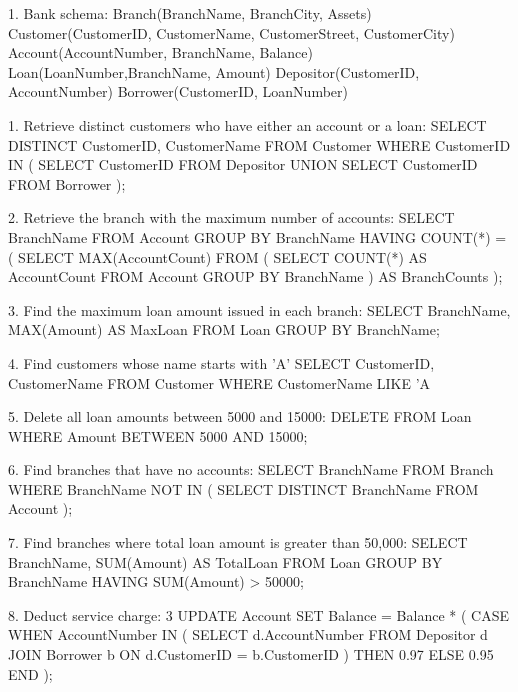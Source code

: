                1. Bank schema:
Branch(BranchName, BranchCity, Assets) Customer(CustomerID,
CustomerName, CustomerStreet, CustomerCity)
Account(AccountNumber, BranchName, Balance) 
Loan(LoanNumber,BranchName, Amount)
Depositor(CustomerID, AccountNumber)
Borrower(CustomerID, LoanNumber)


1. Retrieve distinct customers who have either an account or a loan:
SELECT DISTINCT CustomerID, CustomerName
FROM Customer
WHERE CustomerID IN (
SELECT CustomerID FROM Depositor
UNION
SELECT CustomerID FROM Borrower
);

2. Retrieve the branch with the maximum number of accounts:
SELECT BranchName
FROM Account
GROUP BY BranchName
HAVING COUNT(*) = (
SELECT MAX(AccountCount)
FROM (
SELECT COUNT(*) AS AccountCount
FROM Account
GROUP BY BranchName
) AS BranchCounts
);

3. Find the maximum loan amount issued in each branch:
SELECT BranchName, MAX(Amount) AS MaxLoan
FROM Loan
GROUP BY BranchName;

4. Find customers whose name starts with 'A'
SELECT CustomerID, CustomerName
FROM Customer
WHERE CustomerName LIKE 'A%

5. Delete all loan amounts between 5000 and 15000:
DELETE FROM Loan
WHERE Amount BETWEEN 5000 AND 15000;

6. Find branches that have no accounts:
SELECT BranchName
FROM Branch
WHERE BranchName NOT IN (
SELECT DISTINCT BranchName FROM Account
);

7. Find branches where total loan amount is greater than 50,000:
SELECT BranchName, SUM(Amount) AS TotalLoan
FROM Loan
GROUP BY BranchName
HAVING SUM(Amount) > 50000;

8. Deduct service charge: 3%
UPDATE Account
SET Balance = Balance * (
CASE
WHEN AccountNumber IN (
SELECT d.AccountNumber
FROM Depositor d
JOIN Borrower b ON d.CustomerID = b.CustomerID
) THEN 0.97
ELSE 0.95
END
);
